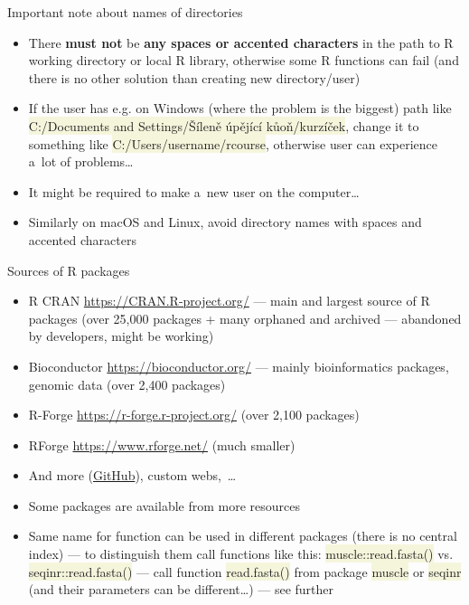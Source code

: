 \documentclass[compress, xelatex, 11pt, xcolor=svgnames, aspectratio=169, url={hyphens, lowtilde}]{beamer}
\renewcommand{\texttt}[1]{\colorbox{Beige}{{\ttfamily #1}}}
\begin{document}
\begin{frame}{Important note about names of directories}
	\begin{itemize}
		\item \alert{There \textbf{must not} be \textbf{any spaces or accented characters} in the path to R working directory or local R library}, otherwise some R functions can fail (and there is no other solution than creating new directory/user)
		\item If the user has e.g. on Windows (where the problem is the biggest) path like \texttt{C:/Documents and Settings/Šíleně úpějící kůoň/kurzíček}, change it to something like \texttt{C:/Users/username/rcourse}, otherwise user can experience a~lot of problems\ldots
		\item It might be required to make a~new user on the computer\ldots
		\item Similarly on macOS and Linux, avoid directory names with spaces and accented characters
	\end{itemize}
\end{frame}

\begin{frame}{Sources of R packages}
	\label{sources}
	\begin{itemize}
		\item R CRAN \url{https://CRAN.R-project.org/} --- main and largest source of R packages (over 25,000 packages + many orphaned and archived --- abandoned by developers, might be working)
		\item Bioconductor \url{https://bioconductor.org/} --- mainly bioinformatics packages, genomic data (over 2,400 packages)
		\item R-Forge \url{https://r-forge.r-project.org/} (over 2,100 packages)
		\item RForge \url{https://www.rforge.net/} (much smaller)
		\item And more (\href{https://github.com/}{GitHub}), custom webs,~\ldots
		\item Some packages are available from more resources
		\item Same name for function can be used in different packages (there is no central index) --- to distinguish them call functions like this: \texttt{muscle::read.fasta()} vs. \texttt{seqinr::read.fasta()} --- call function \texttt{read.fasta()} from package \texttt{muscle} \alert{or} \texttt{seqinr} (and their parameters can be different\ldots) --- see further
	\end{itemize}
\end{frame}
\end{document}
